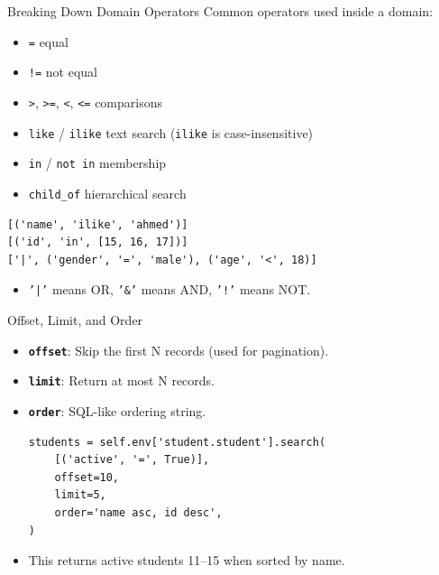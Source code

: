 \begin{frame}[fragile]{Breaking Down Domain Operators}
	Common operators used inside a domain:
	\begin{itemize}
		\item \texttt{=} equal
		\item \texttt{!=} not equal
		\item \texttt{>}, \texttt{>=}, \texttt{<}, \texttt{<=} comparisons
		\item \texttt{like} / \texttt{ilike} text search (\texttt{ilike} is case-insensitive)
		\item \texttt{in} / \texttt{not in} membership
		\item \texttt{child\_of} hierarchical search
	\end{itemize}
\begin{lstlisting}
[('name', 'ilike', 'ahmed')]
[('id', 'in', [15, 16, 17])]
['|', ('gender', '=', 'male'), ('age', '<', 18)]
\end{lstlisting}
	\begin{itemize}
		\item \texttt{'|'} means OR, \texttt{'\&'} means AND, \texttt{'!'} means NOT.
	\end{itemize}
\end{frame}

\begin{frame}[fragile]{Offset, Limit, and Order}
	\begin{itemize}
		\item \textbf{\texttt{offset}}: Skip the first N records (used for pagination).
		\item \textbf{\texttt{limit}}: Return at most N records.
		\item \textbf{\texttt{order}}: SQL-like ordering string.
\begin{lstlisting}
students = self.env['student.student'].search(
	[('active', '=', True)],
	offset=10,
	limit=5,
	order='name asc, id desc',
)
\end{lstlisting}
		\item This returns active students 11--15 when sorted by name.
	\end{itemize}
\end{frame}

